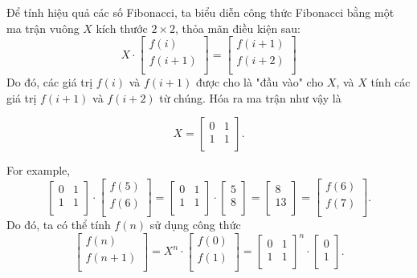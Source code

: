 \begin{samepage}
Để tính hiệu quả các số Fibonacci,
ta biểu diễn công thức Fibonacci
bằng một ma trận vuông $X$ kích thước $2 \times 2$,
thỏa mãn điều kiện sau:
\[ X \cdot
 \begin{bmatrix}
  f(i) \\
  f(i+1) \\
 \end{bmatrix}
=
 \begin{bmatrix}
  f(i+1) \\
  f(i+2) \\
 \end{bmatrix}
 \]
Do đó, các giá trị $f(i)$ và $f(i+1)$ được cho là
"đầu vào" cho $X$,
và $X$ tính các giá trị $f(i+1)$ và $f(i+2)$
từ chúng.
Hóa ra ma trận như vậy là

\[ X = 
 \begin{bmatrix}
  0 & 1 \\
  1 & 1 \\
 \end{bmatrix}.
\]
\end{samepage}
\noindent
For example,
\[
 \begin{bmatrix}
  0 & 1 \\
  1 & 1 \\
 \end{bmatrix}
\cdot
 \begin{bmatrix}
  f(5) \\
  f(6) \\
 \end{bmatrix}
=
 \begin{bmatrix}
  0 & 1 \\
  1 & 1 \\
 \end{bmatrix}
\cdot
 \begin{bmatrix}
  5 \\
  8 \\
 \end{bmatrix}
=
 \begin{bmatrix}
  8 \\
  13 \\
 \end{bmatrix}
=
 \begin{bmatrix}
  f(6) \\
  f(7) \\
 \end{bmatrix}.
\]
Do đó, ta có thể tính $f(n)$ sử dụng công thức
\[
 \begin{bmatrix}
  f(n) \\
  f(n+1) \\
 \end{bmatrix}
=
X^n \cdot
 \begin{bmatrix}
  f(0) \\
  f(1) \\
 \end{bmatrix}
=
 \begin{bmatrix}
  0 & 1 \\
  1 & 1 \\
 \end{bmatrix}^n
\cdot
 \begin{bmatrix}
  0 \\
  1 \\
 \end{bmatrix}.
\]

